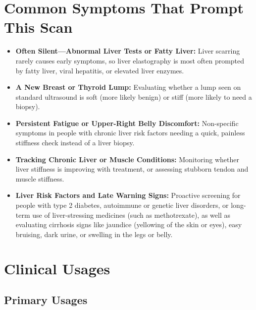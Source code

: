 \section{Common Symptoms That Prompt This Scan}
\begin{itemize}
    \item \textbf{Often Silent---Abnormal Liver Tests or Fatty Liver:} Liver scarring rarely causes early symptoms, so liver elastography is most often prompted by fatty liver, viral hepatitis, or elevated liver enzymes.
    \item \textbf{A New Breast or Thyroid Lump:} Evaluating whether a lump seen on standard ultrasound is soft (more likely benign) or stiff (more likely to need a biopsy).
    \item \textbf{Persistent Fatigue or Upper-Right Belly Discomfort:} Non-specific symptoms in people with chronic liver risk factors needing a quick, painless stiffness check instead of a liver biopsy.
    \item \textbf{Tracking Chronic Liver or Muscle Conditions:} Monitoring whether liver stiffness is improving with treatment, or assessing stubborn tendon and muscle stiffness.
    \item \textbf{Liver Risk Factors and Late Warning Signs:} Proactive screening for people with type 2 diabetes, autoimmune or genetic liver disorders, or long-term use of liver-stressing medicines (such as methotrexate), as well as evaluating cirrhosis signs like jaundice (yellowing of the skin or eyes), easy bruising, dark urine, or swelling in the legs or belly.
\end{itemize}

\section{Clinical Usages}

\subsection{Primary Usages}

